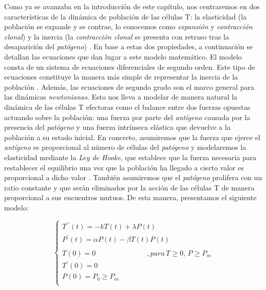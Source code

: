 Como ya se avanzaba en la introducción de este capítulo, nos centraremos en dos características de la dinámica de población de las células T: la elasticidad (la población se expande y se contrae, lo conocemos como \textit{expansión} y \textit{contracción clonal}) y la inercia (la \textit{contracción clonal} se presenta con retraso tras la desaparición del \textit{patógeno}) \citep{arias2015growth}. En base a estas dos propiedades, a continuación se detallan las ecuaciones que dan lugar a este modelo matemático. El modelo consta de un sistema de ecuaciones diferenciales de segundo orden. Este tipo de ecuaciones constituye la manera más simple de representar la inercia de la población \citep{arias2015growth}. Además, las ecuaciones de segundo grado son el marco general para las dinámicas \textit{newtonianas}. Esto nos lleva a modelar de manera natural la dinámica de las células T efectoras como el balance entre dos fuerzas opuestas actuando sobre la población: una fuerza por parte del \textit{antígeno} causada por la presencia del \textit{patógeno} y una fuerza intrínseca elástica que devuelve a la población a su estado inicial. En concreto, asumiremos que la fuerza que ejerce el \textit{antígeno} es proporcional al número de células del \textit{patógeno} y modelaremos la elasticidad mediante la \textit{Ley de Hooke}, que establece que la fuerza necesaria para restablecer el equilibrio una vez que la población ha llegado a cierto valor es proporcional a dicho valor \citep{arias2015growth}. También asumiremos que el \textit{patógeno} prolifera con un ratio constante y que serán eliminados por la acción de las células T de manera proporcional a sus encuentros mutuos. De esta manera, presentamos el siguiente modelo:

\begin{equation}
	\label{sist_macro}
	\left\{ \begin{array}{l}
	{T^{\prime\prime}}(t) = -kT(t) + \lambda P(t) \\
	{P^{\prime}}(t) = \alpha P(t) - \beta T(t)P(t) \\
	\\
	T(0)=0 \hspace{3cm} ,para\, T \geq 0,\, P \geq P_m \\
	T^{\prime}(0)=0  \\
	P(0)=P_0 \geq P_m  \\ 
	\end{array}
	\right.
\end{equation}

